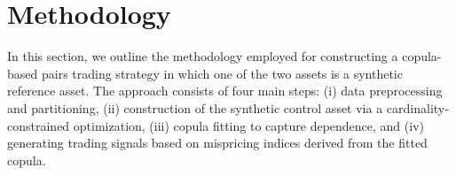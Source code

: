 %
%
%
%
%






\section{Methodology}\label{sec:methodology}

In this section, we outline the methodology employed for constructing a copula-based pairs trading strategy in which one of the two assets is a synthetic reference asset. The approach consists of four main steps: (i) data preprocessing and partitioning, (ii) construction of the synthetic control asset via a cardinality-constrained optimization, (iii) copula fitting to capture dependence, and (iv) generating trading signals based on mispricing indices derived from the fitted copula.

